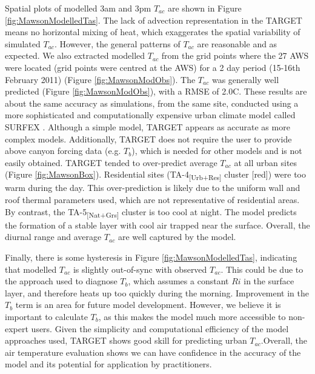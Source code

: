 \documentclass[gmd, manuscript]{copernicus}
\begin{document}
Spatial plots of modelled 3am and 3pm $T_{ac}$ are shown in Figure \ref{fig:MawsonModelledTas}. The lack of advection representation in the TARGET  means no horizontal mixing of heat, which exaggerates the spatial variability of simulated $T_{ac}$. However, the general patterns of $T_{ac}$ are reasonable and as expected. We also extracted modelled $T_{ac}$ from the grid points where the 27 AWS were located (grid points were centred at the AWS) for a 2 day period (15-16th February 2011) (Figure \ref{fig:MawsonModObs}). The $T_{ac}$ was generally well predicted (Figure \ref{fig:MawsonModObs}), with a RMSE of 2.0\degree C. These results are about the same accuracy as simulations, from the same site, conducted using a more sophisticated and computationally expensive urban climate model called SURFEX \citep{Broadbent}.   Although a simple model, TARGET appears as accurate as more complex models. Additionally, TARGET does not require the user to provide  above canyon forcing data (e.g. \ensuremath{T_{b}}), which is needed for other  models and is  not easily obtained.  TARGET  tended  to over-predict average $T_{ac}$ at all urban sites (Figure \ref{fig:MawsonBox}).  Residential sites ({TA-4\textsubscript{[Urb+Res]} } cluster [red]) were  too warm during the day. This over-prediction is likely due to the uniform wall and roof thermal parameters used, which are not representative of residential areas. By contrast, the {TA-5\textsubscript{[Nat+Grs]} } cluster is too cool at night. The model predicts the formation of a stable layer with cool air trapped near the surface. Overall, the diurnal range and average $T_{ac}$ are well captured by the model. 

Finally, there is some hysteresis in Figure \ref{fig:MawsonModelledTas}, indicating that modelled $T_{ac}$ is slightly out-of-sync with observed $T_{ac}$. This could be due to the approach used to  diagnose \ensuremath{T_{b}}, which assumes a constant \ensuremath{Ri} in the surface layer, and therefore heats up too quickly during the morning. Improvement in the \ensuremath{T_{b}}  term is  an area for future model development. However, we believe it is important to calculate \ensuremath{T_{b}}, as this makes the model much more accessible to non-expert users. Given the simplicity and computational efficiency of the model approaches used, TARGET shows good skill for predicting urban $T_{ac}$.Overall, the air temperature evaluation shows we can have confidence in the accuracy of the model and its potential for application by practitioners. 
\end{document}
